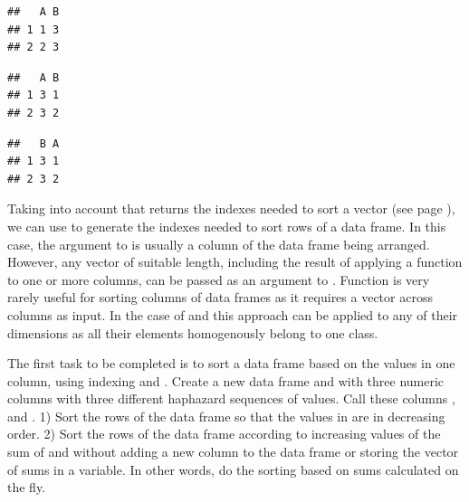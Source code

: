 \documentclass[krantz2]{krantz}\usepackage{knitr}
\begin{document}
\begin{knitrout}\footnotesize
{}\color{fgcolor}\begin{kframe}
\begin{alltt}
 \hlkwb{<-} \hlstd{(} \hlstd{=} \hlopt{:}\hlstd{,}  \hlstd{=} \hlstd{)}
 \hlstd{)}
\end{alltt}
\begin{verbatim}
##   A B
## 1 1 3
## 2 2 3
\end{verbatim}
\begin{alltt}
\hlstd{my_data_frame.df[ ,} \hlopt{:}\hlstd{]} \hlkwb{<-} \hlstd{my_data_frame.df[ ,} \hlopt{:}\hlstd{]}
 \hlstd{)}
\end{alltt}
\begin{verbatim}
##   A B
## 1 3 1
## 2 3 2
\end{verbatim}
\begin{alltt}
\hlstd{(my_data_frame.df)[}\hlopt{:}\hlstd{]} \hlkwb{<-} \hlstd{(my_data_frame.df)[}\hlopt{:}\hlstd{]}
 \hlstd{)}
\end{alltt}
\begin{verbatim}
##   B A
## 1 3 1
## 2 3 2
\end{verbatim}
\end{kframe}
\end{knitrout}

Taking into account that  returns the indexes needed to sort a vector (see page \pageref{box:vec:sort}), we can use  to generate the indexes needed to sort rows of a data frame. In this case, the argument to  is usually a column of the data frame being arranged. However, any vector of suitable length, including the result of applying a function to one or more columns, can be passed as an argument to . Function  is very rarely useful for sorting columns of data frames as it requires a vector across columns as input. In the case of  and  this approach can be applied to any of their dimensions as all their elements homogenously belong to one class.

\begin{playground}
The first task to be completed is to sort a data frame based on the values in one column, using indexing and . Create a new data frame and with three numeric columns with three different haphazard sequences of values. Call these columns ,  and . 1) Sort the rows of the data frame so that the values in  are in decreasing order. 2) Sort the rows of the data frame according to increasing values of the sum of  and  without adding a new column to the data frame or storing the vector of sums in a variable. In other words, do the sorting based on sums calculated on the fly.
\end{playground}
\end{document}
